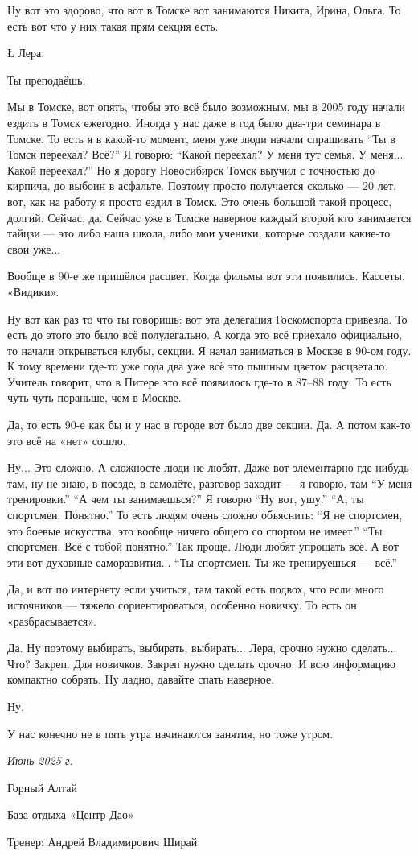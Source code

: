 \I
Ну вот это здорово,
что вот
в Томске вот занимаются
Никита, Ирина, Ольга.
То есть вот
что у них такая прям
секция есть.

\L
Лера.

\N
Ты преподаёшь.

\A
Мы в Томске,
вот опять,
чтобы это всё было возможным,
мы в 2005 году
начали ездить
в Томск
ежегодно.
Иногда у нас даже
в год было
два-три семинара
в Томске.
То есть я
в какой-то момент,
меня уже люди
начали спрашивать
``Ты в Томск переехал?
Всё?''
Я говорю: ``Какой переехал?
У меня тут семья.
У меня...
Какой переехал?''
Но я дорогу
Новосибирск Томск
выучил
с точностью до
кирпича,
до выбоин
в асфальте.
Поэтому
просто
получается
сколько ---
20 лет,
вот,
как на работу
я просто ездил
в Томск.
Это очень большой
такой процесс,
долгий.
Сейчас, да.
Сейчас
уже в Томске
наверное
каждый второй
кто занимается
тайцзи ---
это
либо наша школа,
либо
мои ученики,
которые создали
какие-то свои
уже...

\I
Вообще
в 90-е же
пришёлся
расцвет.
Когда
фильмы
вот эти
появились.
Кассеты.
«Видики».

\A
Ну вот
как раз
то что ты говоришь:
вот эта
делегация
Госкомспорта
привезла.
То есть
до этого
это было
всё полулегально.
А
когда
это всё
приехало
официально,
то начали открываться клубы, секции.
Я начал заниматься в Москве в 90-ом
году.
К тому времени
где-то уже
года два
уже всё это
пышным цветом
расцветало.
Учитель
говорит,
что
в Питере
это всё
появилось
где-то
в 87--88 году.
То есть
чуть-чуть
пораньше,
чем в Москве.

\I
Да,
то есть 90-е
как бы
и у нас
в городе
вот было
две секции.
Да.
А потом
как-то это всё на «нет» сошло.

\A
Ну... Это сложно.
А сложносте люди не любят.
Даже
вот
элементарно
где-нибудь
там,
ну не знаю,
в поезде,
в самолёте,
разговор заходит ---
я говорю, там ``У меня тренировки.''
``А чем ты занимаешься?''
Я говорю ``Ну вот, ушу.''
``А, ты спортсмен. Понятно.''
То есть
людям
очень сложно
объяснить: ``Я не спортсмен,
это боевые искусства,
это вообще ничего общего
со спортом
не имеет.''
``Ты спортсмен. Всё с тобой понятно.''
Так проще. Люди любят упрощать всё.
А вот эти вот
духовные
саморазвития...
``Ты спортсмен.
Ты же тренируешься --- всё.''

\I
Да, и вот
по интернету
если учиться,
там
такой
есть
подвох,
что если
много источников ---
тяжело
сориентироваться,
особенно
новичку.
То есть
он «разбрасывается».

\A
Да.
Ну поэтому
выбирать, выбирать, выбирать...
Лера,
срочно
нужно
сделать...
Что?
Закреп. Для новичков.
Закреп нужно сделать срочно.
И всю
информацию
компактно
собрать.
Ну
ладно,
давайте
спать
наверное.

\I
Ну.

\A
У нас
конечно
не в пять утра
начинаются
занятия,
но
тоже
утром.

\kern2cm
\it
\lineskip=7pt
\hskip6cm Июнь 2025 г. \par
\hskip4cm Горный Алтай \par
\hskip5cm База отдыха «Центр Дао» \par
\kern3cm
\hskip2cm \tensl Тренер: Андрей Владимирович Ширай

\bye
